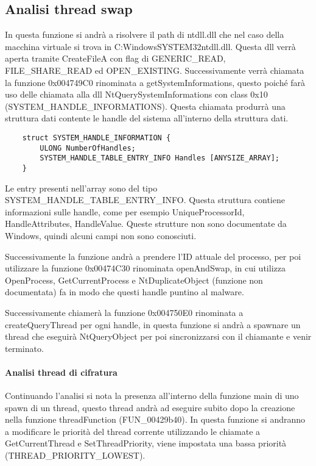\documentclass[]{article}
\begin{document}
\subsection{Analisi thread swap}
In questa funzione si andrà a risolvere il path di ntdll.dll che nel caso della macchina virtuale si trova in C:WindowsSYSTEM32ntdll.dll. Questa dll verrà aperta tramite CreateFileA con flag di GENERIC\_READ, FILE\_SHARE\_READ ed OPEN\_EXISTING. Successivamente verrà chiamata la funzione 0x004749C0 rinominata a getSystemInformations, questo poiché farà uso delle chiamata alla dll NtQuerySystemInformations con class 0x10 (SYSTEM\_HANDLE\_INFORMATIONS). Questa chiamata produrrà una struttura dati contente le handle del sistema all'interno della struttura dati.
\begin{verbatim}
	struct SYSTEM_HANDLE_INFORMATION {
		ULONG NumberOfHandles;
		SYSTEM_HANDLE_TABLE_ENTRY_INFO Handles [ANYSIZE_ARRAY];
	}
\end{verbatim}

Le entry presenti nell'array sono del tipo SYSTEM\_HANDLE\_TABLE\_ENTRY\_INFO. Questa struttura contiene informazioni sulle handle, come per esempio UniqueProcessorId, HandleAttributes, HandleValue. Queste strutture non sono documentate da Windows, quindi alcuni campi non sono conosciuti. 

Successivamente la funzione andrà a prendere l'ID attuale del processo, per poi utilizzare la funzione 0x00474C30 rinominata openAndSwap, in cui utilizza OpenProcess, GetCurrentProcess e NtDuplicateObject (funzione non documentata) fa in modo che questi handle puntino al malware. 

Successivamente chiamerà la funzione 0x004750E0 rinominata a createQueryThread per ogni handle, in questa funzione si andrà a spawnare un thread che eseguirà NtQueryObject per poi sincronizzarsi con il  chiamante e venir terminato.

\paragraph{Analisi thread di cifratura}
Continuando l'analisi si nota la presenza all'interno della funzione main di uno spawn di un thread, questo thread andrà ad eseguire subito dopo la creazione nella funzione threadFunction (FUN\_00429b40).  In questa funzione si andranno a modificare le priorità del thread corrente utilizzando le chiamate a GetCurrentThread e SetThreadPriority, viene impostata una bassa priorità (THREAD\_PRIORITY\_LOWEST).
\end{document}

